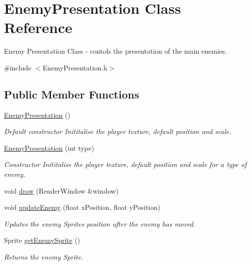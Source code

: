 \hypertarget{class_enemy_presentation}{}\section{Enemy\+Presentation Class Reference}
\label{class_enemy_presentation}


Enemy Presentation Class -\/ contols the presentation of the main enemies.  




{\ttfamily \#include $<$Enemy\+Presentation.\+h$>$}

\subsection*{Public Member Functions}
\begin{DoxyCompactItemize}
\item 
\hyperlink{class_enemy_presentation_aa17b851454a7bc3a86a6c20e803f5e76}{Enemy\+Presentation} ()
\begin{DoxyCompactList}\small\item\em Default constructor Inititalise the player texture, default position and scale. \end{DoxyCompactList}\item 
\hyperlink{class_enemy_presentation_a78e7f250c31e2e6d6327ead1ef12f4c8}{Enemy\+Presentation} (int type)
\begin{DoxyCompactList}\small\item\em Constructor Inititalise the player texture, default position and scale for a type of enemy. \end{DoxyCompactList}\item 
void \hyperlink{class_enemy_presentation_a9af0b870bea65e9fa170f6eb20394265}{draw} (Render\+Window \&window)
\item 
void \hyperlink{class_enemy_presentation_adc38a8f56b24ec4aea9157dd74884b40}{update\+Enemy} (float x\+Position, float y\+Position)
\begin{DoxyCompactList}\small\item\em Updates the enemy Sprite\textquotesingle{}s position after the enemy has moved. \end{DoxyCompactList}\item 
Sprite \hyperlink{class_enemy_presentation_a9b88f3f215f5f94028f732005c68daa9}{get\+Enemy\+Sprite} ()
\begin{DoxyCompactList}\small\item\em Returns the enemy Sprite. \end{DoxyCompactList}\item 

\end{DoxyCompactItemize}
